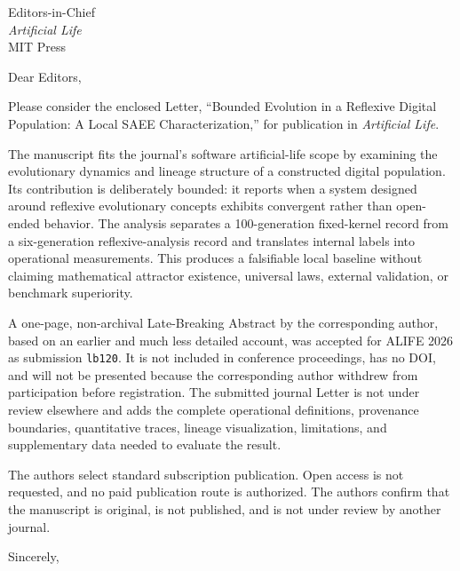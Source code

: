 \documentclass[11pt]{letter}
\date{19 July 2026}
\begin{document}
\begin{letter}{Editors-in-Chief\\
\textit{Artificial Life}\\
MIT Press}

\opening{Dear Editors,}

Please consider the enclosed Letter, ``Bounded Evolution in a Reflexive
Digital Population: A Local SAEE Characterization,'' for publication in
\textit{Artificial Life}.

The manuscript fits the journal's software artificial-life scope by examining
the evolutionary dynamics and lineage structure of a constructed digital
population. Its contribution is deliberately bounded: it reports when a system
designed around reflexive evolutionary concepts exhibits convergent rather
than open-ended behavior. The analysis separates a 100-generation fixed-kernel
record from a six-generation reflexive-analysis record and translates internal
labels into operational measurements. This produces a falsifiable local
baseline without claiming mathematical attractor existence, universal laws,
external validation, or benchmark superiority.

A one-page, non-archival Late-Breaking Abstract by the corresponding author,
based on an earlier and much less detailed account, was accepted for ALIFE 2026
as submission \texttt{lb120}. It is not included in conference proceedings,
has no DOI, and will not be presented because the corresponding author withdrew
from participation before registration.
The submitted journal Letter is not under review elsewhere and adds the
complete operational definitions, provenance boundaries, quantitative traces,
lineage visualization, limitations, and supplementary data needed to evaluate
the result.

The authors select standard subscription publication. Open access is not
requested, and no paid publication route is authorized. The authors confirm
that the manuscript is original, is not published, and is not under review by
another journal.

\closing{Sincerely,}

\end{letter}
\end{document}
